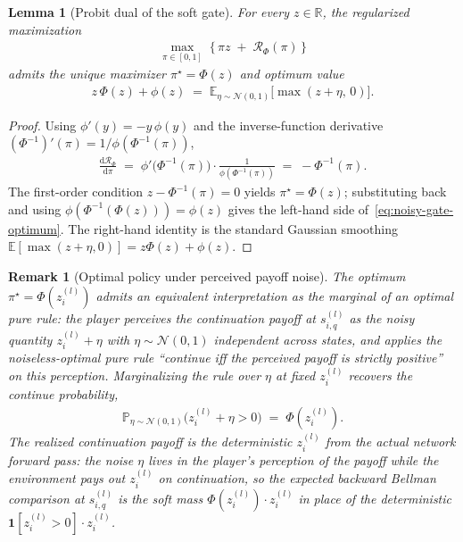 \documentclass[twoside]{article}
\newcommand{\RR}{\mathbb{R}}
\renewcommand{\P}{\mathbb{P}}
\providecommand{\E}{}
\renewcommand{\E}{\mathbb{E}}
\newcommand{\1}{\mathbf{1}}
\newtheorem{lemma}{Lemma}
\newtheorem{remark}{Remark}
\begin{document}
\begin{lemma}[Probit dual of the soft gate]\label{lem:noisy-gate-dual}
For every $z\in\RR$, the regularized maximization
\begin{align}\label{eq:noisy-gate-objective}
    \max_{\pi \in [0,1]}\; \bigl\{\,\pi z \;+\; \mathcal{R}_\Phi(\pi)\,\bigr\}
\end{align}
admits the unique maximizer $\pi^\star = \Phi(z)$ and optimum value
\begin{align}\label{eq:noisy-gate-optimum}
    z\,\Phi(z) + \phi(z) \;=\; \E_{\eta\sim\mathcal{N}(0,1)}\!\bigl[\max(z+\eta,\,0)\bigr].
\end{align}
\end{lemma}

\begin{proof}
Using $\phi'(y) = -y\,\phi(y)$ and the inverse-function derivative $(\Phi^{-1})'(\pi) =
    1/\phi(\Phi^{-1}(\pi))$,
\begin{align}\label{eq:noisy-gate-deriv}
    \frac{\mathrm{d}\mathcal{R}_\Phi}{\mathrm{d}\pi}
    \;=\; \phi'\!\bigl(\Phi^{-1}(\pi)\bigr) \cdot \frac{1}{\phi(\Phi^{-1}(\pi))}
    \;=\; -\Phi^{-1}(\pi).
\end{align}
The first-order condition $z - \Phi^{-1}(\pi) = 0$ yields $\pi^\star = \Phi(z)$; substituting back
and using $\phi(\Phi^{-1}(\Phi(z))) = \phi(z)$ gives the left-hand side
of~\eqref{eq:noisy-gate-optimum}. The right-hand identity is the standard Gaussian smoothing
$\E[\max(z+\eta,0)] = z\Phi(z) + \phi(z)$.
\end{proof}

\begin{remark}[Optimal policy under perceived payoff noise]\label{rem:noisy-gate-perception}
The optimum $\pi^\star = \Phi(z_i^{(l)})$ admits an equivalent interpretation as the marginal of an
optimal pure rule: the player perceives the continuation payoff at $s_{i,q}^{(l)}$ as the noisy
quantity $z_i^{(l)} + \eta$ with $\eta \sim \mathcal{N}(0,1)$ independent across states, and
applies the noiseless-optimal pure rule \emph{``continue iff the perceived payoff is strictly
positive''} on this perception. Marginalizing the rule over $\eta$ at fixed $z_i^{(l)}$ recovers
the continue probability,
\begin{align}\label{eq:noisy-gate-marginal}
    \P_{\eta\sim\mathcal{N}(0,1)}\!\bigl(z_i^{(l)} + \eta > 0\bigr) \;=\; \Phi(z_i^{(l)}).
\end{align}
The realized continuation payoff is the deterministic $z_i^{(l)}$ from the actual network forward
pass: the noise $\eta$ lives in the player's perception of the payoff while the environment pays
out $z_i^{(l)}$ on continuation, so the expected backward Bellman comparison at $s_{i,q}^{(l)}$ is
the soft mass $\Phi(z_i^{(l)}) \cdot z_i^{(l)}$ in place of the deterministic $\1[z_i^{(l)} >
    0]\cdot z_i^{(l)}$.
\end{remark}
\end{document}
